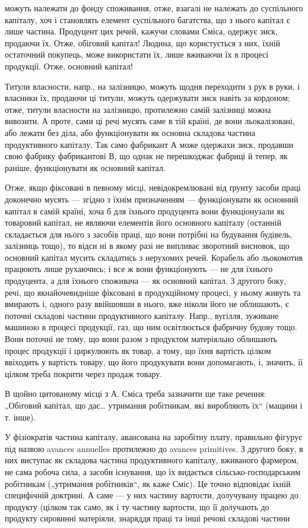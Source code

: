 \parcont{}  %
можуть належати до фонду споживання, отже, взагалі не належать до
суспільного капіталу, хоч і становлять елемент суспільного багатства, що
з нього капітал є лише частина. Продуцент цих речей, кажучи словами
Сміса, одержує зиск, продаючи їх. Отже, обіговий капітал! Людина, що
користується з них, їхній остаточний покупець, може використати їх, лише
вживаючи їх в процесі продукції. Отже, основний капітал!

Титули власности, напр., на залізницю, можуть щодня переходити з
рук в руки, і власники їх, продаючи ці титули, можуть одержувати зиск
навіть за кордоном; отже, титули власности на залізницю, протилежно
самій залізниці можна вивозити. А проте, сами ці речі мусять саме в тій
країні, де вони льокалізовані, або лежати без діла, або функціонувати як
основна складова частина продуктивного капіталу. Так само фабрикант
$А$ може одержахи зиск, продавши свою фабрику фабрикантові $В$, що однак
не перешкоджає фабриці й тепер, як раніше, функціонувати як основний
капітал.

Отже, якщо фіксовані в певному місці, невідокремлювані від ґрунту
засоби праці доконечно мусять — згідно з їхнім призначенням — функціонувати
як основний капітал в самій країні, хоча б для їхнього продуцента
вони функціонузали як товаровий капітал, не являючи елементів його
основного капіталу (останній складається для нього з засобів праці, що
вони потрібні на будування будівель, залізниць тощо), то відси ні в
якому разі не випливає зворотний висновок, що основний капітал мусить
складатись з нерухомих речей. Корабель або льокомотив працюють
лише рухаючись; і все ж вони функціонують — не для їхнього продуцента,
а для їхнього споживача — як основний капітал. З другого боку,
речі, що якнайочевидніше фіксовані в продукційному процесі, у ньому
живуть та вмирають і, одного разу ввійшовши в нього, вже ніколи його
не облишають, є поточні складові частини продуктивного капіталу. Напр.,
вугілля, зуживане машиною в процесі продукції, газ, що ним освітлюється
фабричну будову тощо. Вони поточні не тому, що вони разом з
продуктом матеріяльно облишають процес продукції і циркулюють як
товар, а тому, що їхня вартість цілком ввіходить у вартість товару, що
його продукувати вони допомагають, і, значить, її цілком треба покрити
через продаж товару.

В щойно цитованому місці з А. Сміса треба зазначити ще таке речення:
„Обіговий капітал, що дає\dots{} утримання робітникам, які виробляють
їх“ (мащини і т. інше).

У фізіократів частина капіталу, авансована на заробітну плату, правильно
фігурує під назвою avances annuelles протилежно до avances primitives.
З другого боку, в них виступає як складова частина продуктивного
капіталу, вживаного фармером, не сама робоча сила, а засоби існування,
що їх видається сільсько-господарським робітникам („утримання
робітників“, як каже Сміс). Це точно відповідає їхній специфічній доктрині.
А саме — у них частину вартости, долучувану працею до продукту
(цілком так само, як і ту частину вартости, що її долучають до продукту
сировинні матеріяли, знаряддя праці та інші речові складові частини
\parbreak{}  %
